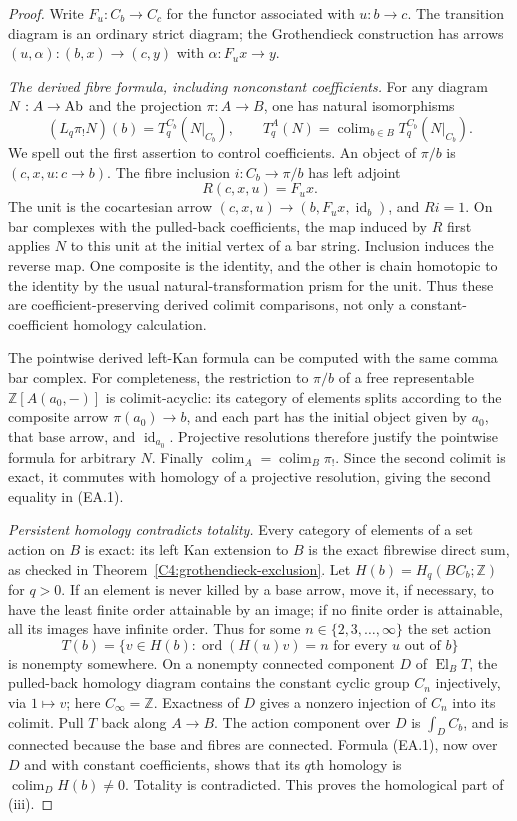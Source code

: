 \begin{proof}
Write $F_u:C_b\to C_c$ for the functor associated with
$u:b\to c$. The transition diagram is an ordinary strict
diagram; the Grothendieck construction has arrows
$(u,\alpha):(b,x)\to(c,y)$ with
$\alpha:F_u x\to y$.

\emph{The derived fibre formula, including nonconstant coefficients.}
For any diagram $N:A\to\mathrm{Ab}$ and the projection $\pi:A\to B$,
one has natural isomorphisms
\[
 (L_q\pi_!N)(b)=T_q^{C_b}(N|_{C_b}),\qquad
 T_q^A(N)=\operatorname{colim}_{b\in B}
             T_q^{C_b}(N|_{C_b}).
 \tag{EA.1}
\]
We spell out the first assertion to control coefficients.
An object of $\pi/b$ is $(c,x,u:c\to b)$. The fibre inclusion
$i:C_b\to\pi/b$ has left adjoint
\[
 R(c,x,u)=F_u x.
\]
The unit is the cocartesian arrow
$(c,x,u)\to(b,F_u x,\operatorname{id}_b)$, and $Ri=1$.
On bar complexes with the pulled-back coefficients, the map
induced by $R$ first applies $N$ to this unit at the initial
vertex of a bar string. Inclusion induces the reverse map.
One composite is the identity, and the other is chain homotopic
to the identity by the usual natural-transformation prism for
the unit. Thus these are coefficient-preserving derived
colimit comparisons, not only a constant-coefficient homology
calculation.

The pointwise derived left-Kan formula can be computed with
the same comma bar complex. For completeness, the restriction
to $\pi/b$ of a free representable $\mathbb Z[A(a_0,-)]$ is
colimit-acyclic: its category of elements splits according to
the composite arrow $\pi(a_0)\to b$, and each part has the
initial object given by $a_0$, that base arrow, and
$\operatorname{id}_{a_0}$. Projective resolutions therefore
justify the pointwise formula for arbitrary $N$. Finally
$\operatorname{colim}_A=\operatorname{colim}_B\pi_!$.
Since the second colimit is exact, it commutes with homology
of a projective resolution, giving the second equality in
(EA.1).

\emph{Persistent homology contradicts totality.}
Every category of elements of a set action on $B$ is exact:
its left Kan extension to $B$ is the exact fibrewise direct
sum, as checked in Theorem~\ref{C4:grothendieck-exclusion}.
Let $H(b)=H_q(BC_b;\mathbb Z)$ for $q>0$. If an element is
never killed by a base arrow, move it, if necessary, to have
the least finite order attainable by an image; if no finite
order is attainable, all its images have infinite order.
Thus for some $n\in\{2,3,\ldots,\infty\}$ the set action
\[
 T(b)=\{v\in H(b):\operatorname{ord}(H(u)v)=n
                    \text{ for every }u\text{ out of }b\}
\]
is nonempty somewhere. On a nonempty connected component
$D$ of $\operatorname{El}_B T$, the pulled-back homology
diagram contains the constant cyclic group $C_n$ injectively,
via $1\mapsto v$; here $C_\infty=\mathbb Z$. Exactness of
$D$ gives a nonzero injection of $C_n$ into its colimit.
Pull $T$ back along $A\to B$. The action component over $D$
is $\int_D C_b$, and is connected because the base and fibres
are connected. Formula (EA.1), now over $D$ and with constant
coefficients, shows that its $q$th homology is
$\operatorname{colim}_D H(b)\ne0$. Totality is contradicted.
This proves the homological part of (iii).


\end{proof}
